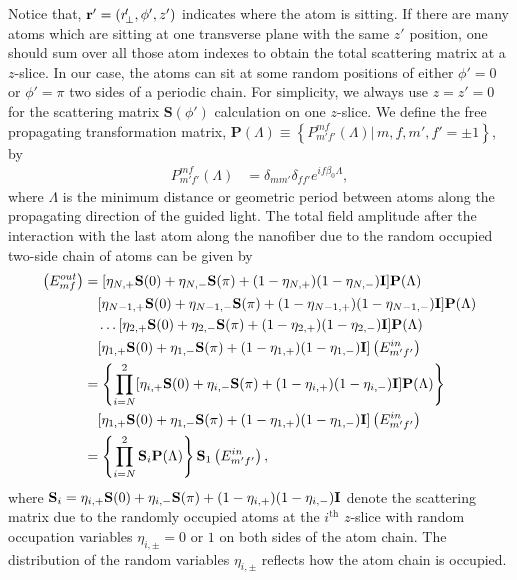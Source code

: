 \documentclass[preprint,aps,pra,onecolumn]{revtex4-1} %
\begin{document}
Notice that, $\mathbf{r}'=(r\!_\perp^\prime,\phi',z')$ indicates where the atom is sitting. If there are many atoms which are sitting at one transverse plane with the same $z'$ position, one should sum over all those atom indexes to obtain the total scattering matrix at a $z$-slice. In our case, the atoms can sit at some random positions of either $\phi'=0$ or $\phi'=\pi$ two sides of a periodic chain. For simplicity, we always use $z=z'=0$ for the scattering matrix $\mathbf{S}(\phi')$ calculation on one $z$-slice. We define the free propagating transformation matrix, $\mathbf{P}(\Lambda)\equiv \left\{P^{mf}_{m'f'}(\Lambda)|\,m,f,m',f'=\pm 1 \right\}$, by
\begin{align}
P^{mf}_{m'f'}(\Lambda) &= \delta_{mm'}\delta_{ff'}e^{if\beta_0 \Lambda},
\end{align}
where $\Lambda$ is the minimum distance or geometric period between atoms along the propagating direction of the guided light. The total field amplitude after the interaction with the last atom along the nanofiber due to the random occupied two-side chain of atoms can be given by
\begin{align}
\left( E_{mf}^{out}\right) &= [\eta_{N,+} \mathbf{S}(0) +\eta_{N,-}\mathbf{S}(\pi) +(1-\eta_{N,+})(1-\eta_{N,-})\mathbf{I}] \mathbf{P}(\Lambda)\nonumber\\
&\quad [\eta_{N-1,+} \mathbf{S}(0) +\eta_{N-1,-}\mathbf{S}(\pi)+(1-\eta_{N-1,+})(1-\eta_{N-1,-})\mathbf{I} ] \mathbf{P}(\Lambda)\nonumber\\
&\quad \ldots [\eta_{2,+} \mathbf{S}(0) +\eta_{2,-}\mathbf{S}(\pi)+(1-\eta_{2,+})(1-\eta_{2,-})\mathbf{I} ] \mathbf{P}(\Lambda)\nonumber\\
&\quad [\eta_{1,+} \mathbf{S}(0) +\eta_{1,-}\mathbf{S}(\pi) +(1-\eta_{1,+})(1-\eta_{1,-})\mathbf{I}] \left( E_{m'f'}^{in}\right)\\
&= \left\{ \prod_{i=N}^2 [\eta_{i,+} \mathbf{S}(0) +\eta_{i,-}\mathbf{S}(\pi)+(1-\eta_{i,+})(1-\eta_{i,-})\mathbf{I} ] \mathbf{P}(\Lambda)\right\} \nonumber\\
&\quad [\eta_{1,+} \mathbf{S}(0) +\eta_{1,-}\mathbf{S}(\pi)+(1-\eta_{1,+})(1-\eta_{1,-})\mathbf{I} ]\left( E_{m'f'}^{in}\right)\\
&= \left\{ \prod_{i=N}^2 \mathbf{S}_i \mathbf{P}(\Lambda)\right\} \mathbf{S}_1 \left( E_{m'f'}^{in}\right),\label{eq:transE}
\end{align}
where $\mathbf{S}_i=\eta_{i,+} \mathbf{S}(0) +\eta_{i,-}\mathbf{S}(\pi)+(1-\eta_{i,+})(1-\eta_{i,-})\mathbf{I} $ denote the scattering matrix due to the randomly occupied atoms at the $i^{\mathrm{th}}$ $z$-slice with random occupation variables $\eta_{i,\pm}=0$ or $1$ on both sides of the atom chain. The distribution of the random variables $\eta_{i,\pm}$ reflects how the atom chain is occupied. 
\end{document}
